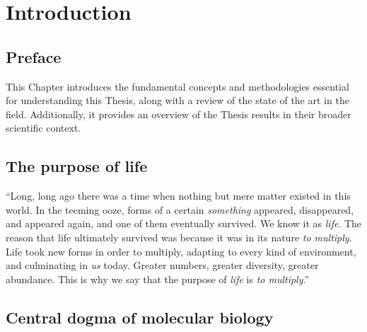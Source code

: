 \chapter{Introduction}

\section*{Preface}


This Chapter introduces the fundamental concepts and methodologies essential for understanding this Thesis, along with a review of the state of the art in the field. Additionally, it provides an overview of the Thesis results in their broader scientific context.

\section{The purpose of life}

``Long, long ago there was a time when nothing but mere matter existed in this world. In the teeming ooze, forms of a certain \textit{something} appeared, disappeared, and appeared again, and one of them eventually survived. We know it as \textit{life}. The reason that life ultimately survived was because it was in its nature \textit{to multiply}. Life took new forms in order to multiply, adapting to every kind of environment, and culminating in \textit{us} today. Greater numbers, greater diversity, greater abundance. This is why we say that the purpose of \textit{life} is \textit{to multiply}.'' \cite{ISAYAMA_2021}

\section{Central dogma of molecular biology}

